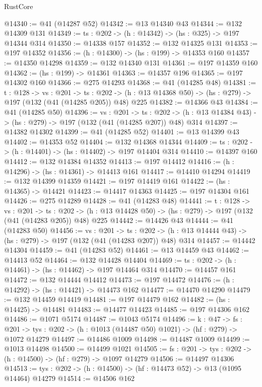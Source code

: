 \begin{lexlean}{RustCore}
\begin{coremodule}
@14340 := @41 (@14287 @52)
@14342 := @13 @14340 @43
@14344 := @132 @14309 @131
@14349 := {ts : @202} -> (h : @14342) -> (hs : @325) -> @197 @14344 @314
@14350 := @14338 @157
@14352 := @132 @14325 @131
@14353 := @197 @14352
@14356 := (h : @14300) -> (hs : @199) -> @14353 @160
@14357 := @14350 @14298
@14359 := @132 @14340 @131
@14361 := @197 @14359 @160
@14362 := (hs : @199) -> @14361
@14363 := @14357 @196
@14365 := @197 @14302 @160
@14366 := @275 @14293
@14368 := @41 (@14285 @48)
@14381 := {t : @128} ->
  {vs : @201} ->
  {ts : @202} -> (h : @13 @14368 @50) -> (hs : @279) -> @197 (@132 (@41 (@14285 @205)) @48) @225
@14382 := @14366 @43
@14384 := @41 (@14285 @50)
@14396 := {vs : @201} ->
  {ts : @202} -> (h : @13 @14384 @43) -> (hs : @279) -> @197 (@132 (@41 (@14285 @207)) @48) @314
@14397 := @14382 @14302
@14399 := @41 (@14285 @52)
@14401 := @13 @14399 @43
@14402 := @14353 @52
@14404 := @132 @14368 @14344
@14409 := {ts : @202} -> (h : @14401) -> (hs : @14402) -> @197 @14404 @314
@14410 := @14397 @160
@14412 := @132 @14384 @14352
@14413 := @197 @14412
@14416 := (h : @14296) -> (hs : @14361) -> @14413 @161
@14417 := @14410 @14294
@14419 := @132 @14399 @14359
@14421 := @197 @14419 @161
@14422 := (hs : @14365) -> @14421
@14423 := @14417 @14363
@14425 := @197 @14304 @161
@14426 := @275 @14289
@14428 := @41 (@14283 @48)
@14441 := {t : @128} ->
  {vs : @201} ->
  {ts : @202} -> (h : @13 @14428 @50) -> (hs : @279) -> @197 (@132 (@41 (@14283 @205)) @48) @225
@14442 := @14426 @43
@14444 := @41 (@14283 @50)
@14456 := {vs : @201} ->
  {ts : @202} -> (h : @13 @14444 @43) -> (hs : @279) -> @197 (@132 (@41 (@14283 @207)) @48) @314
@14457 := @14442 @14304
@14459 := @41 (@14283 @52)
@14461 := @13 @14459 @43
@14462 := @14413 @52
@14464 := @132 @14428 @14404
@14469 := {ts : @202} -> (h : @14461) -> (hs : @14462) -> @197 @14464 @314
@14470 := @14457 @161
@14472 := @132 @14444 @14412
@14473 := @197 @14472
@14476 := (h : @14292) -> (hs : @14421) -> @14473 @162
@14477 := @14470 @14290
@14479 := @132 @14459 @14419
@14481 := @197 @14479 @162
@14482 := (hs : @14425) -> @14481
@14483 := @14477 @14423
@14485 := @197 @14306 @162
@14486 := @1071 @5174
@14487 := @1043 @5174
@14496 := {k : @47} ->
  {fs : @201} -> {tys : @202} -> (h : @1013 (@14487 @50) @1021) -> (hf : @279) -> @1072 @14279
@14497 := @14486 @1009
@14498 := @14487 @1009
@14499 := @1013 @14498
@14500 := @14499 @1021
@14505 := {fs : @201} -> {tys : @202} -> (h : @14500) -> (hf : @279) -> @1097 @14279
@14506 := @14497 @14306
@14513 := {tys : @202} -> (h : @14500) -> (hf : @14473 @52) -> @13 (@1095 @14464) @14279
@14514 := @14506 @162

\end{coremodule}
\end{lexlean}
